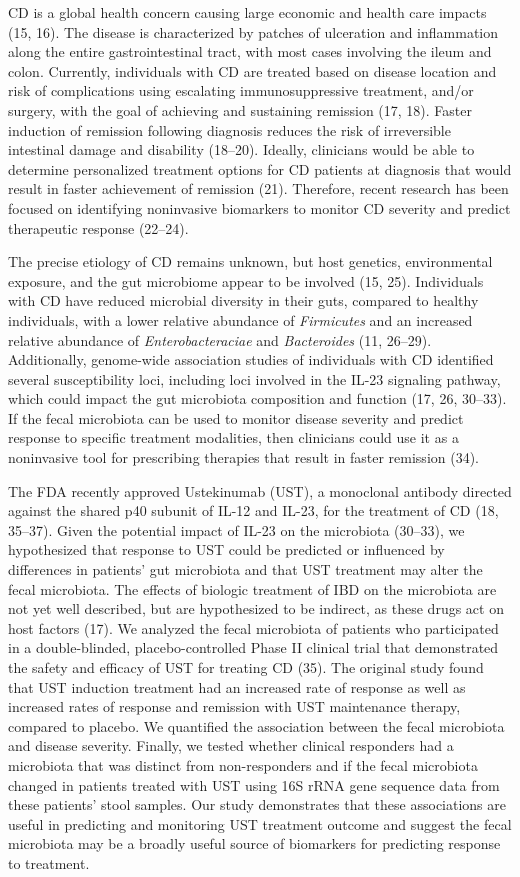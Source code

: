 \documentclass[12pt,]{article}
\begin{document}
CD is a global health concern causing large economic and health care
impacts (15, 16). The disease is characterized by patches of ulceration
and inflammation along the entire gastrointestinal tract, with most
cases involving the ileum and colon. Currently, individuals with CD are
treated based on disease location and risk of complications using
escalating immunosuppressive treatment, and/or surgery, with the goal of
achieving and sustaining remission (17, 18). Faster induction of
remission following diagnosis reduces the risk of irreversible
intestinal damage and disability (18--20). Ideally, clinicians would be
able to determine personalized treatment options for CD patients at
diagnosis that would result in faster achievement of remission (21).
Therefore, recent research has been focused on identifying noninvasive
biomarkers to monitor CD severity and predict therapeutic response
(22--24).

The precise etiology of CD remains unknown, but host genetics,
environmental exposure, and the gut microbiome appear to be involved
(15, 25). Individuals with CD have reduced microbial diversity in their
guts, compared to healthy individuals, with a lower relative abundance
of \emph{Firmicutes} and an increased relative abundance of
\emph{Enterobacteraciae} and \emph{Bacteroides} (11, 26--29).
Additionally, genome-wide association studies of individuals with CD
identified several susceptibility loci, including loci involved in the
IL-23 signaling pathway, which could impact the gut microbiota
composition and function (17, 26, 30--33). If the fecal microbiota can
be used to monitor disease severity and predict response to specific
treatment modalities, then clinicians could use it as a noninvasive tool
for prescribing therapies that result in faster remission (34).

The FDA recently approved Ustekinumab (UST), a monoclonal antibody
directed against the shared p40 subunit of IL-12 and IL-23, for the
treatment of CD (18, 35--37). Given the potential impact of IL-23 on the
microbiota (30--33), we hypothesized that response to UST could be
predicted or influenced by differences in patients' gut microbiota and
that UST treatment may alter the fecal microbiota. The effects of
biologic treatment of IBD on the microbiota are not yet well described,
but are hypothesized to be indirect, as these drugs act on host factors
(17). We analyzed the fecal microbiota of patients who participated in a
double-blinded, placebo-controlled Phase II clinical trial that
demonstrated the safety and efficacy of UST for treating CD (35). The
original study found that UST induction treatment had an increased rate
of response as well as increased rates of response and remission with
UST maintenance therapy, compared to placebo. We quantified the
association between the fecal microbiota and disease severity. Finally,
we tested whether clinical responders had a microbiota that was distinct
from non-responders and if the fecal microbiota changed in patients
treated with UST using 16S rRNA gene sequence data from these patients'
stool samples. Our study demonstrates that these associations are useful
in predicting and monitoring UST treatment outcome and suggest the fecal
microbiota may be a broadly useful source of biomarkers for predicting
response to treatment.
\end{document}
